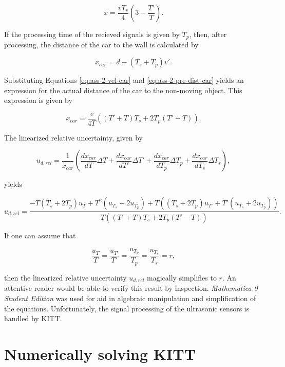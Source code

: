 \documentclass[11pt,titlepage]{report}
\begin{document}
\begin{appendices}
\begin{equation} \label{eq:ass-2-pre-dist-car}
	x = \frac{v T_s}{4} \left(3 - \frac{T'}{T} \right).
\end{equation}

If the processing time of the recieved signals is given by $T_p$, then, after processing, the distance of the car to the wall is calculated by

\begin{equation}
	x_{car} = d-(T_s +T_p) v'.
\end{equation}

Substituting Equations \ref{eq:ass-2-vel-car} and \ref{eq:ass-2-pre-dist-car} yields an expression for the actual distance of the car to the non-moving object. This expression is given by

\begin{equation}
	x_{car} = \frac{v}{4 T} \left((T'+T) T_s + 2 T_p (T'-T)  \right).
\end{equation}

The linearized relative uncertainty, given by

\begin{equation}
	u_{d,rel} = \frac{1}{x_{car}} \left( \frac{d x_{car}}{d T} \Delta T + \frac{d x_{car}}{d T'} \Delta T' + \frac{d x_{car}}{d T_p} \Delta T_p + \frac{d x_{car}}{d T_s} \Delta T_s \right),
\end{equation}

yields

\begin{equation}
	u_{d,rel} = \frac{
		-T(T_s + 2 T_p) u_T + T^2 (u_{T_s} - 2 u_{T_p}) + T \left( (T_s + 2 T_p) u_{T'} + T' (u_{T_s} + 2 u_{T_p}) \right)
	}{
		T \left( (T'+T)T_s + 2 T_p (T'-T) \right)
	}.
\end{equation}

If one can assume that

\begin{equation}
	\frac{u_T}{T} = \frac{u_{T'}}{T'} = \frac{u_{T_p}}{T_p} = \frac{u_{T_s}}{T_s}=r,
\end{equation}

then the linearized relative uncertainty $u_{d,rel}$ magically simplifies to $r$. An attentive reader would be able to verify this result by inspection. \textit{Mathematica 9 Student Edition} was used for aid in algebraic manipulation and simplification of the equations. Unfortunately, the signal processing of the ultrasonic sensors is handled by KITT.

\chapter{Numerically solving KITT}


\end{appendices}
\end{document}
